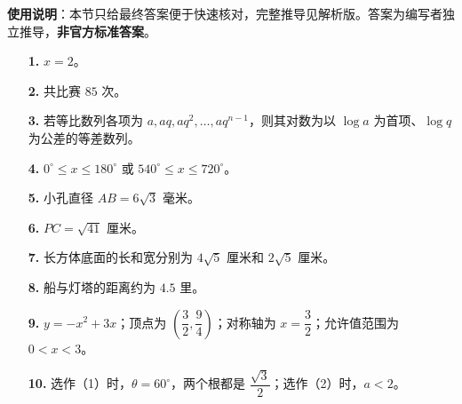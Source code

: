 
\begin{gknotice}
\textbf{使用说明}：本节只给最终答案便于快速核对，完整推导见解析版。答案为编写者独立推导，\textbf{非官方标准答案}。
\end{gknotice}

\begin{itemize}[leftmargin=2.6em]
  \item[\textbf{1.}] $x=2$。
  \item[\textbf{2.}] 共比赛 $85$ 次。
  \item[\textbf{3.}] 若等比数列各项为 $a,aq,aq^2,\ldots,aq^{n-1}$，则其对数为以 $\log a$ 为首项、$\log q$ 为公差的等差数列。
  \item[\textbf{4.}] $0^\circ\le x\le180^\circ$ 或 $540^\circ\le x\le720^\circ$。
  \item[\textbf{5.}] 小孔直径 $AB=6\sqrt3$ 毫米。
  \item[\textbf{6.}] $PC=\sqrt{41}$ 厘米。
\end{itemize}

\begin{itemize}[leftmargin=2.6em]
  \item[\textbf{7.}] 长方体底面的长和宽分别为 $4\sqrt5$ 厘米和 $2\sqrt5$ 厘米。
  \item[\textbf{8.}] 船与灯塔的距离约为 $4.5$ 里。
  \item[\textbf{9.}] $y=-x^2+3x$；顶点为 $\left(\dfrac32,\dfrac94\right)$；对称轴为 $x=\dfrac32$；允许值范围为 $0<x<3$。
  \item[\textbf{10.}] 选作（1）时，$\theta=60^\circ$，两个根都是 $\dfrac{\sqrt3}{2}$；选作（2）时，$a<2$。
\end{itemize}
